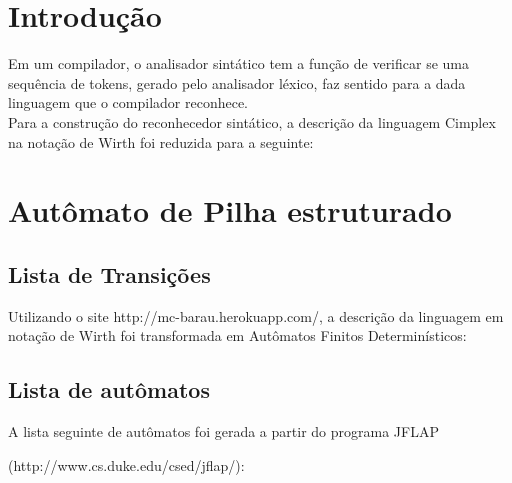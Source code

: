 \label{Cap:Sintático}

\section{Introdução}
Em um compilador, o analisador sintático tem a função de verificar se uma  sequência de tokens, gerado pelo analisador léxico, faz sentido para a dada linguagem que o compilador reconhece.\\

Para a construção do reconhecedor sintático, a descrição da linguagem Cimplex na notação de Wirth foi reduzida para a seguinte: 



\section{Autômato de Pilha estruturado}
\subsection{Lista de Transições}

Utilizando o site http://mc-barau.herokuapp.com/, a descrição da linguagem em notação de Wirth foi transformada em Autômatos Finitos Determinísticos:



\subsection{Lista de autômatos}

A lista seguinte de autômatos foi gerada a partir do programa JFLAP

(http://www.cs.duke.edu/csed/jflap/):


